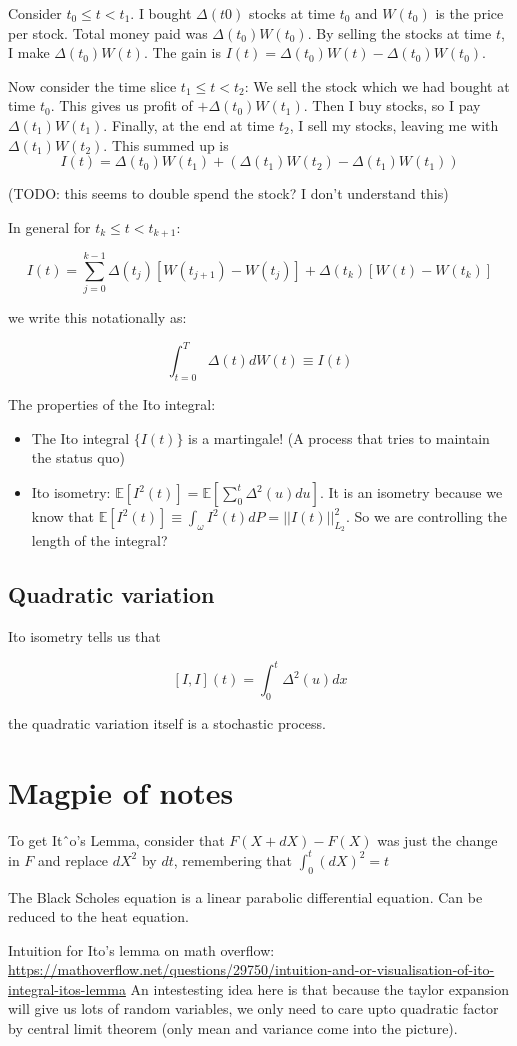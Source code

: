 \documentclass{book}
\newcommand{\E}{\ensuremath{\mathbb{E}}}
\theoremstyle{definition}
\begin{document}
Consider $t_0 \leq t < t_1$. I bought $\Delta(t0)$ stocks at time $t_0$ and
$W(t_0)$ is the price per stock. Total money paid  was $\Delta(t_0) W(t_0)$.
By selling the stocks at time $t$, I make $\Delta(t_0) W(t)$. The gain is 
$I(t) = \Delta(t_0) W(t) -\Delta(t_0) W(t_0)$.


Now consider the time slice $t_1 \leq t < t_2$: We sell the stock which we
had bought at time $t_0$. This gives us profit of $+\Delta(t_0)W(t_1)$. Then
I buy stocks, so I pay $\Delta(t_1)W(t_1)$. Finally, at the end at time $t_2$,
I sell my stocks, leaving me with $\Delta(t_1)W(t_2)$. This summed up is
$$I(t) = \Delta(t_0)W(t_1) + (\Delta(t_1)W(t_2) - \Delta(t_1)W(t_1))$$

(TODO: this seems to double spend the stock? I don't understand this)


In general for $t_k \leq t < t_{k+1}$:

$$
I(t) = \sum_{j=0}^{k-1} \Delta(t_j) [W(t_{j+1}) - W(t_j)] + \Delta(t_k)[W(t) - W(t_k)]
$$

we write this notationally as:

$$
\int_{t=0}^T \Delta(t) dW(t) \equiv I(t)
$$

The properties of the Ito integral:

\begin{itemize}
\item The Ito integral $\{ I(t) \}$ is a martingale! (A process that tries to maintain the status quo)
\item Ito isometry: $\E[I^2(t)] = \E[\sum_0^t \Delta^2(u) du]$. It is an isometry because
  we know that $\E[I^2(t)] \equiv \int_{\omega} I^2(t) dP = ||I(t)||^2_{L_2}$. So we are 
  controlling the length of the integral?
\end{itemize}

\section{Quadratic variation}
Ito isometry tells us that 

$$
[I, I](t) = \int_0^t \Delta^2(u) dx
$$

the quadratic variation itself is a stochastic process.

\chapter{Magpie of notes}

To get Itˆo’s Lemma, consider that $F(X + dX) − F(X)$ was just the
change in $F$ and replace $dX^2$ by $dt$, remembering that $\int_0^t (dX)^2 = t$

The Black Scholes equation is a linear parabolic differential equation. Can be
reduced to the heat equation.

Intuition for Ito's lemma on math overflow: \url{https://mathoverflow.net/questions/29750/intuition-and-or-visualisation-of-ito-integral-itos-lemma}
An intestesting idea here is that because the taylor expansion will give us lots of random
variables, we only need to care upto quadratic factor by central limit theorem (only mean and variance come into the picture).
\end{document}
